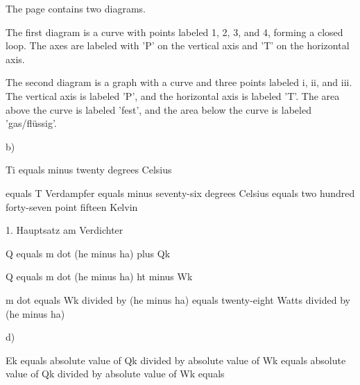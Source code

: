 The page contains two diagrams. 

The first diagram is a curve with points labeled 1, 2, 3, and 4, forming a closed loop. The axes are labeled with 'P' on the vertical axis and 'T' on the horizontal axis.

The second diagram is a graph with a curve and three points labeled i, ii, and iii. The vertical axis is labeled 'P', and the horizontal axis is labeled 'T'. The area above the curve is labeled 'fest', and the area below the curve is labeled 'gas/flüssig'.

b)

Ti equals minus twenty degrees Celsius

equals T Verdampfer equals minus seventy-six degrees Celsius equals two hundred forty-seven point fifteen Kelvin

1. Hauptsatz am Verdichter

Q equals m dot (he minus ha) plus Qk

Q equals m dot (he minus ha) ht minus Wk

m dot equals Wk divided by (he minus ha) equals twenty-eight Watts divided by (he minus ha)

d)

Ek equals absolute value of Qk divided by absolute value of Wk equals absolute value of Qk divided by absolute value of Wk equals
